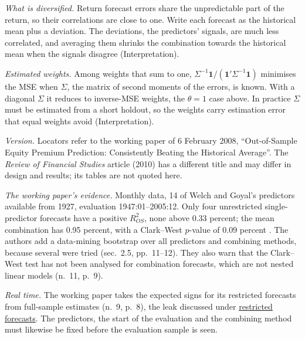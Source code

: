 \begin{qfmethod}
\emph{What is diversified.} Return forecast errors share the unpredictable part of the return, so their correlations are close to one. Write each forecast as the historical mean plus a deviation. The deviations, the predictors' signals, are much less correlated, and averaging them shrinks the combination towards the historical mean when the signals disagree (Interpretation).

\emph{Estimated weights.} Among weights that sum to one, $\Sigma^{-1}\mathbf 1/(\mathbf 1'\Sigma^{-1}\mathbf 1)$ minimises the MSE when $\Sigma$, the matrix of second moments of the errors, is known. With a diagonal $\Sigma$ it reduces to inverse-MSE weights, the $\theta=1$ case above. In practice $\Sigma$ must be estimated from a short holdout, so the weights carry estimation error that equal weights avoid (Interpretation).

 \emph{Version.} Locators refer to the working paper of 6 February 2008, ``Out-of-Sample Equity Premium Prediction: Consistently Beating the Historical Average''. The \emph{Review of Financial Studies} article (2010) has a different title and may differ in design and results; its tables are not quoted here.

\emph{The working paper's evidence.} Monthly data, 14 of Welch and Goyal's predictors available from 1927, evaluation 1947:01--2005:12. Only four unrestricted single-predictor forecasts have a positive $R^2_{OS}$, none above 0.33 percent; the mean combination has 0.95 percent, with a Clark--West $p$-value of 0.09 percent \citep[pp.~12--13, 16 and Table~1, panels A--B, unnumbered table page]{rapach-strauss-zhou-2008-wp}. The authors add a data-mining bootstrap over all predictors and combining methods, because several were tried (sec.~2.5, pp.~11--12). They also warn that the Clark--West test has not been analysed for combination forecasts, which are not nested linear models (n.~11, p.~9).

\emph{Real time.} The working paper takes the expected signs for its restricted forecasts from full-sample estimates (n.~9, p.~8), the leak discussed under \hyperref[meth:restricted-forecast-value]{restricted forecasts}. The predictors, the start of the evaluation and the combining method must likewise be fixed before the evaluation sample is seen.


\end{qfmethod}
